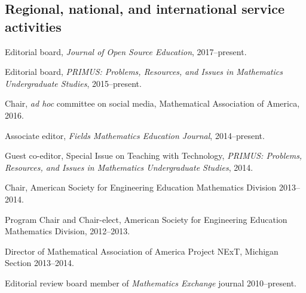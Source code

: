 \documentclass[letterpaper]{article}
\renewenvironment{itemize}{
  \begin{list}{}{
    \setlength{\leftmargin}{1.5em}
	\setlength{\itemsep}{0in}
  }
}{
  \end{list}
}
\begin{document}
\subsection*{Regional, national, and international service activities}
\begin{itemize}
	\item Editorial board, \emph{Journal of Open Source Education}, 2017--present. 
	\item Editorial board, \emph{PRIMUS: Problems, Resources, and Issues in Mathematics Undergraduate Studies}, 2015--present.
	\item Chair, \emph{ad hoc} committee on social media, Mathematical Association of America, 2016. 
	\item Associate editor, \emph{Fields Mathematics Education Journal}, 2014--present. 
	\item Guest co-editor, Special Issue on Teaching with Technology, \emph{PRIMUS: Problems, Resources, and Issues in Mathematics Undergraduate Studies}, 2014.
	\item Chair, American Society for Engineering Education Mathematics Division 2013--2014. 
	\item Program Chair and Chair-elect, American Society for Engineering Education Mathematics Division, 2012--2013. 
	\item Director of Mathematical Association of America Project NExT, Michigan Section 2013--2014. 
	\item Editorial review board member of \emph{Mathematics Exchange} journal 2010--present. 
\end{itemize}
\end{document}
